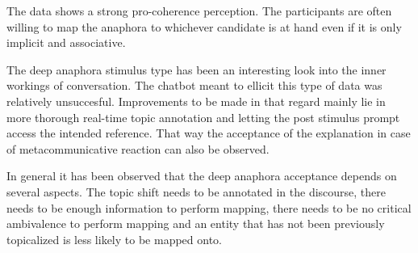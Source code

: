 The data shows a strong pro-coherence perception.
The participants are often willing to map the anaphora to whichever candidate is at hand
even if it is only implicit and associative.

The deep anaphora stimulus type has been an interesting look into the inner workings of conversation.
The chatbot meant to ellicit this type of data was relatively unsuccesful.
Improvements to be made in that regard mainly lie in more thorough real-time topic annotation
and letting the post stimulus prompt access the intended reference.
That way the acceptance of the explanation in case of metacommunicative reaction can also be observed.

In general it has been observed that the deep anaphora acceptance depends on several aspects.
The topic shift needs to be annotated in the discourse,
there needs to be enough information to perform mapping,
there needs to be no critical ambivalence to perform mapping and
an entity that has not been previously topicalized is less likely to be mapped onto.

